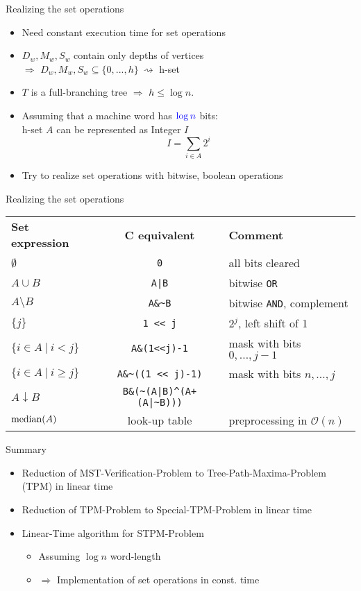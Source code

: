 \documentclass[18pt]{beamer}
\begin{document}
\begin{frame}{Realizing the set operations}
	\begin{itemize}
		\item Need constant execution time for {\color{blue}set operations}
		\bigskip
		\item $D_w, M_w, S_w$ contain only depths of vertices \\
			 $\Rightarrow$ $D_w, M_w, S_w \subseteq \{0,...,h\} \ \rightsquigarrow$ {\color{blue} h-set}
		\bigskip
		\item $T$ is a full-branching tree $\Rightarrow$ $h \le \log n$. 
		\bigskip
		\item Assuming that a machine word has $\color{blue} \log n$ bits: \\
			  h-set $A$ can be represented as Integer $I$
			  \[ I = \sum_{i\in A} 2^i \]
		\item Try to realize set operations with bitwise, boolean operations
		
	\end{itemize}
\end{frame}
\begin{frame}{Realizing the set operations}
	
	\begin{tabular}[]{ l c l }
		\textbf{Set expression} & \textbf{C equivalent} & \textbf{Comment} \\
		$\emptyset$ & \texttt{0} & all bits cleared \\
		$A \cup B$ & \texttt{A|B} & bitwise \texttt{OR} \\
		$A \setminus B$ & \texttt{A\&\textasciitilde B}  & bitwise \texttt{AND}, complement \\
		$\{j\}$ & \texttt{1 << j} & $2^j$, left shift of 1 \\
		$\{i \in A \ | \ i < j \}$ & \texttt{A\&(1<<j)-1} & mask with bits $0,\dots,j-1$\\
		$\{i\in A \ | \ i \ge j \} $ & \texttt{A\&\textasciitilde((1 << j)-1)}	& mask with bits $n,\dots,j$ \\
		$A \downarrow B$ & \texttt{B\&(\textasciitilde(A|B)\^{}(A+(A|\textasciitilde B)))} \\
		$\textup{median}(A)$ & look-up table & preprocessing in $\mathcal{O}(n)$
	\end{tabular}
 \end{frame}
\begin{frame}{Summary}
	\begin{itemize}
		\item Reduction of {\color{blue}MST-Verification}-Problem to {\color{blue}Tree-Path-Maxima}-Problem (TPM) in linear time
		\bigskip
		\item Reduction of TPM-Problem to {\color{blue}Special-TPM}-Problem in linear time
		\bigskip
		\item Linear-Time algorithm for STPM-Problem
			\begin{itemize}
				\item Assuming $\log n$ word-length 
				\item[] $\Rightarrow$ Implementation of {\color{blue} set operations} in const. time
		\end{itemize}
	\end{itemize}
\end{frame}
\end{document}
